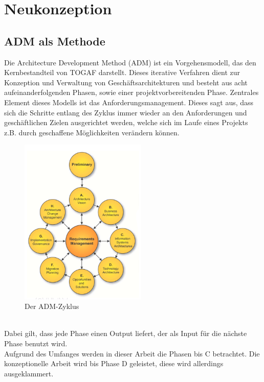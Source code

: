 \chapter{Neukonzeption}

\section{ADM als Methode}
Die Architecture Development Method (ADM) ist ein Vorgehensmodell, das den Kernbestandteil von TOGAF darstellt. 
Dieses iterative Verfahren dient zur Konzeption und Verwaltung von Geschäftsarchitekturen und besteht aus acht aufeinanderfolgenden Phasen, sowie einer projektvorbereitenden Phase.
Zentrales Element dieses Modells ist das Anforderungsmanagement.
Dieses sagt aus, dass sich die Schritte entlang des Zyklus immer wieder an den Anforderungen und geschäftlichen Zielen ausgerichtet werden, welche sich im Laufe eines Projekts z.B. durch geschaffene Möglichkeiten verändern können.\\
\begin{figure}[!htb]
\centering
\includegraphics[height=80mm]{images/adm-cycle}
\caption[ADM-Zyklus]{Der ADM-Zyklus \protect\footnotemark}
\label{ADM-Zyklus}
\end{figure}
\\
Dabei gilt, dass jede Phase einen Output liefert, der als Input für die nächste Phase benutzt wird.\\
Aufgrund des Umfanges werden in dieser Arbeit die Phasen bis C betrachtet. Die konzeptionelle Arbeit wird bis Phase D geleistet, diese wird allerdings ausgeklammert.
